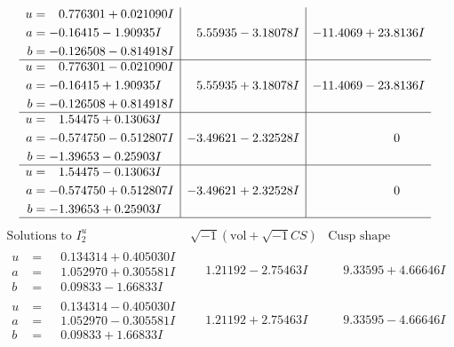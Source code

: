 \documentclass[1p]{elsarticle_modified}
\theoremstyle{definition}
\newcommand{\I}{\sqrt{-1}}
\begin{document}
$$\begin{array}{c|c|c}
\begin{aligned}
u &= \phantom{-}0.776301 + 0.021090 I \\
a &= -0.16415 - 1.90935 I \\
b &= -0.126508 - 0.814918 I\end{aligned}
 & \phantom{-}5.55935 - 3.18078 I & -11.4069 + 23.8136 I \\ \hline\begin{aligned}
u &= \phantom{-}0.776301 - 0.021090 I \\
a &= -0.16415 + 1.90935 I \\
b &= -0.126508 + 0.814918 I\end{aligned}
 & \phantom{-}5.55935 + 3.18078 I & -11.4069 - 23.8136 I \\ \hline\begin{aligned}
u &= \phantom{-}1.54475 + 0.13063 I \\
a &= -0.574750 - 0.512807 I \\
b &= -1.39653 - 0.25903 I\end{aligned}
 & -3.49621 - 2.32528 I & \phantom{-0.000000 } 0 \\ \hline\begin{aligned}
u &= \phantom{-}1.54475 - 0.13063 I \\
a &= -0.574750 + 0.512807 I \\
b &= -1.39653 + 0.25903 I\end{aligned}
 & -3.49621 + 2.32528 I & \phantom{-0.000000 } 0\\
 \hline 
 \end{array}$$\newpage$$\begin{array}{c|c|c}  
\text{Solutions to }I^u_{2}& \I (\text{vol} + \sqrt{-1}CS) & \text{Cusp shape}\\
 \hline 
\begin{aligned}
u &= \phantom{-}0.134314 + 0.405030 I \\
a &= \phantom{-}1.052970 + 0.305581 I \\
b &= \phantom{-}0.09833 - 1.66833 I\end{aligned}
 & \phantom{-}1.21192 - 2.75463 I & \phantom{-}9.33595 + 4.66646 I \\ \hline\begin{aligned}
u &= \phantom{-}0.134314 - 0.405030 I \\
a &= \phantom{-}1.052970 - 0.305581 I \\
b &= \phantom{-}0.09833 + 1.66833 I\end{aligned}
 & \phantom{-}1.21192 + 2.75463 I & \phantom{-}9.33595 - 4.66646 I \\ \hline\begin{aligned}

\end{aligned}
\end{array}$$
\end{document}
